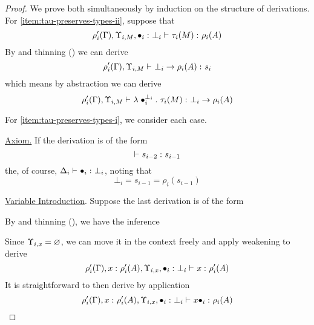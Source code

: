 \documentclass{article}
\begin{document}
\begin{proof}
We prove both simultaneously by induction on the structure of derivations.
For \autoref{item:tau-preserves-types-ii}, suppose that
\[
    \judgment {
        \rho_i'(\Gamma), \Upsilon_{i, M},
        \statement {\bullet_i} {\bot_i}
    }{
        \tau_i(M)
    }{
        \rho_i(A)
    }
\]
By  and thinning () we can derive
\[
    \judgment {
        \rho_i'(\Gamma), \Upsilon_{i, M}
    }{
        \bot_i \to \rho_i(A)
    }{
        s_i
    }
\]
which means by abstraction we can derive
\[
    \judgment {
        \rho_i'(\Gamma), \Upsilon_{i, M}
    }{
        \lambdaT {\bullet_i} {\bot_i} {\tau_i(M)}
    }{
        \bot_i \to \rho_i(A)
    }
\]

For \autoref{item:tau-preserves-types-i}, we consider each case.

\noindent\underline{Axiom.}
If the derivation is of the form
\[
    \judgment{}{s_{i - 2}}{s_{i - 1}}
\]
the, of course,
$
    \judgment{\Delta_i}{\bullet_i}{\bot_i}
$,
noting that 
\[
\bot_i = s_{i - 1} = \rho_i(s_{i - 1})
\]

\noindent\underline{Variable Introduction}.
Suppose the last derivation is of the form
\begin{prooftree}
\end{prooftree}
By  and thinning (), we have the inference
 \begin{prooftree}
\end{prooftree}
Since $\Upsilon_{i, x} = \emptyContext$, we can move it in the context freely and apply weakening to derive
\[
    \judgment {
        \rho_i'(\Gamma),
        \statement x {\rho_i'(A)},
        \Upsilon_{i,x},
        \statement {\bullet_i} {\bot_i}
    }{
        x 
    }{
        \rho_i'(A)
    }
\]
It is straightforward to then derive by application
\[
    \judgment {
        \rho_i'(\Gamma),
        \statement x {\rho_i'(A)},
        \Upsilon_{i, x},
        \statement {\bullet_i} {\bot_i}
    }{
        x\bullet_i
    }{
        \rho_i(A)
    }
\]


\end{proof}
\end{document}
